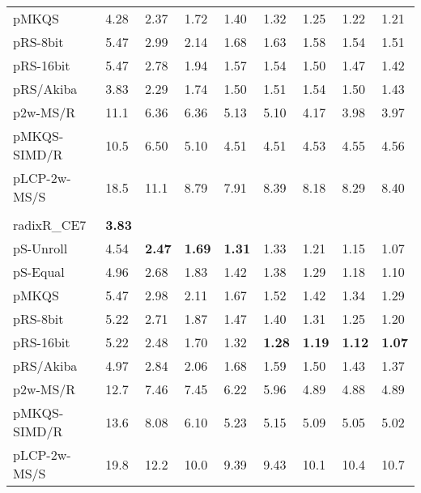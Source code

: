 \documentclass[a4paper]{myjournal}
\begin{document}
\begin{table}
\begin{tabularx}{\linewidth}{l|*{8}{>{\hfill}X}|@{}}
        pMKQS &     4.28 &     2.37 &     1.72 &      1.40 &      1.32 &      1.25 &      1.22 &      1.21 \\
     pRS-8bit &     5.47 &     2.99 &     2.14 &      1.68 &      1.63 &      1.58 &      1.54 &      1.51 \\
    pRS-16bit &     5.47 &     2.78 &     1.94 &      1.57 &      1.54 &      1.50 &      1.47 &      1.42 \\
    pRS/Akiba &     3.83 &     2.29 &     1.74 &      1.50 &      1.51 &      1.54 &      1.50 &      1.43 \\
     p2w-MS/R &     11.1 &     6.36 &     6.36 &      5.13 &      5.10 &      4.17 &      3.98 &      3.97 \\
 pMKQS-SIMD/R &     10.5 &     6.50 &     5.10 &      4.51 &      4.51 &      4.53 &      4.55 &      4.56 \\
 pLCP-2w-MS/S &     18.5 &     11.1 &     8.79 &      7.91 &      8.39 &      8.18 &      8.29 &      8.40 \\ \hline
& \multicolumn{8}{l|}{\textbf{Sinha NoDup} (complete), , , } \\ \cline{2-9}
radixR\_CE7 & \bf 3.83 &  &  &  &  &  &  &  \\
pS-Unroll & 4.54 & \bf 2.47 & \bf 1.69 & \bf 1.31 &     1.33 &     1.21 &     1.15 &     1.07 \\
 pS-Equal & 4.96 &     2.68 &     1.83 &     1.42 &     1.38 &     1.29 &     1.18 &     1.10 \\
        pMKQS & 5.47 &     2.98 &     2.11 &     1.67 &     1.52 &     1.42 &     1.34 &     1.29 \\
     pRS-8bit & 5.22 &     2.71 &     1.87 &     1.47 &     1.40 &     1.31 &     1.25 &     1.20 \\
    pRS-16bit & 5.22 &     2.48 &     1.70 &     1.32 & \bf 1.28 & \bf 1.19 & \bf 1.12 & \bf 1.07 \\
    pRS/Akiba & 4.97 &     2.84 &     2.06 &     1.68 &     1.59 &     1.50 &     1.43 &     1.37 \\
     p2w-MS/R & 12.7 &     7.46 &     7.45 &     6.22 &     5.96 &     4.89 &     4.88 &     4.89 \\
 pMKQS-SIMD/R & 13.6 &     8.08 &     6.10 &     5.23 &     5.15 &     5.09 &     5.05 &     5.02 \\
 pLCP-2w-MS/S & 19.8 &     12.2 &     10.0 &     9.39 &     9.43 &     10.1 &     10.4 &     10.7 \\ \hline
\end{tabularx}
\end{table}
\end{document}
